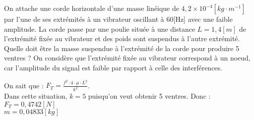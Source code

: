 \begin{exercise}
    On attache une corde horizontale d'une masse linéique de \(4,2 \times 10^{-4} [kg \cdot m^{-1}]\) par l'une de ses extrémités à un vibrateur oscillant à 60[Hz] avec une faible amplitude. La corde passe par une poulie située à une distance \(L=1,4[m]\) de l'extrémité fixée au vibrateur et des poids sont suspendus à l'autre extrémité.
    Quelle doit être la masse suspendue à l'extrémité de la corde pour produire 5 ventres ? On considère que l'extrémité fixée au vibrateur correspond à un noeud, car l'amplitude du signal est faible par rapport à celle des interférences.
\end{exercise}
\begin{solution}
    On sait que : \(F_T=\frac{f^2 \cdot 4 \cdot \mu \cdot L^2}{k^2}\). \\
    Dans cette situation, \(k=5\) puisqu'on veut obtenir 5 ventres. Donc :\\
    \(F_T=0,4742[N]\) \\
    \(m=0,04833[kg]\)

\end{solution}